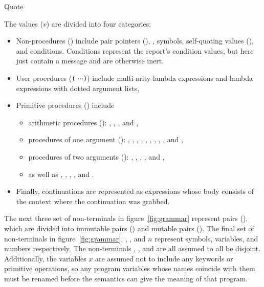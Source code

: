 \beginfig
\begin{center}



\end{center}
\caption{Quote}\label{fig:quote}
\endfig

The values ($v$) are divided into four categories:
%
\begin{itemize}
\item Non-procedures () include pair pointers
  (), , symbols, self-quoting values
  (), and conditions. Conditions represent
  the report's condition values, but here just contain a message and
  are otherwise inert.
\item User procedures (\texttt{(}    $\cdots$\texttt{)}) include multi-arity lambda expressions and lambda expressions with dotted argument lists,
\item Primitive procedures () include

\begin{itemize}
\item
 arithmetic procedures
  (): \va{+}, \va{-}, \va{/}, and \va{*}, 
\item 
  procedures of one
  argument (): , , , ,
  , , , , , and , 
  \item
  procedures of
  two arguments (): , , , ,
  and , 
  \item as well as , ,
  , , and .
\end{itemize}
\item Finally, continuations are represented as  expressions
  whose body consists of the context where the continuation was
  grabbed.
\end{itemize}
%
The next three set of non-terminals in figure~\ref{fig:grammar} represent pairs (), which are divided into immutable pairs () and mutable pairs (). The final set of non-terminals in figure~\ref{fig:grammar}, ,
, and $n$ represent symbols, variables, and
numbers respectively. The non-terminals , , and  are all assumed to all be disjoint. Additionally, the variables $x$ are assumed not to include any keywords or primitive operations, so any program variables whose names coincide with them must be renamed before the semantics can give the meaning of that program.

